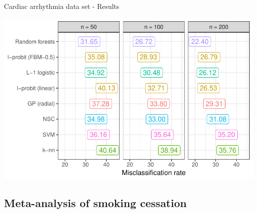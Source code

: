 \documentclass{beamer}\usepackage[]{graphicx}\usepackage[]{color}
\makeatletter
\def\maxwidth{ %
  \ifdim\Gin@nat@width>\linewidth
    \linewidth
  \else
    \Gin@nat@width
  \fi
}
\newenvironment{knitrout}{}{} %
\makeatother
\begin{document}
\begin{frame}[fragile]{Cardiac arrhythmia data set - Results}
\begin{knitrout}\small
{}\color{fgcolor}

{\centering \includegraphics[width=\maxwidth]{figure/cardiac-res-plot-1} 

}



\end{knitrout}
\end{frame}

\subsection*{Meta-analysis of smoking cessation}
\end{document}

